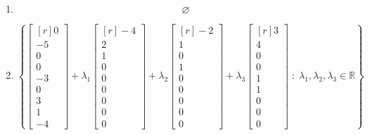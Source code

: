 \documentclass[12pt]{article}
\begin{document}
\begin{enumerate}
\[+\lambda_{5}\begin{bmatrix*}[r]3\\0\\0\\0\\0\\-4\\-2\\1\\0\end{bmatrix*}
+\lambda_{6}\begin{bmatrix*}[r]3\\0\\0\\0\\0\\1\\-3\\0\\1\end{bmatrix*}
\;:\;\lambda_{1},\lambda_{2},\lambda_{3},\lambda_{4},\lambda_{5},\lambda_{6}\in\mathbb{R}\right\}
\]
\item\[\varnothing\]
\item\[\left\{\begin{bmatrix*}[r]0\\-5\\0\\0\\-3\\0\\3\\1\\-4\end{bmatrix*}
+\lambda_{1}\begin{bmatrix*}[r]-4\\2\\1\\0\\0\\0\\0\\0\\0\end{bmatrix*}
+\lambda_{2}\begin{bmatrix*}[r]-2\\1\\0\\1\\0\\0\\0\\0\\0\end{bmatrix*}
+\lambda_{3}\begin{bmatrix*}[r]3\\4\\0\\0\\1\\1\\0\\0\\0\end{bmatrix*}
\;:\;\lambda_{1},\lambda_{2},\lambda_{3}\in\mathbb{R}\right\}
\]

\end{enumerate}
\end{document}
